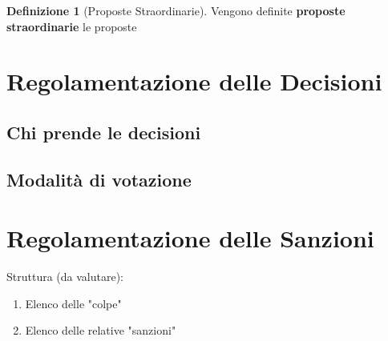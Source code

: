 \documentclass[]{article}
\theoremstyle{definition}
\newtheorem{defn}{Definizione}[section]
\begin{document}
\begin{defn}[Proposte Straordinarie]
	Vengono definite \textbf{proposte straordinarie} le proposte
\end{defn}


\section{Regolamentazione delle Decisioni}

\subsection{Chi prende le decisioni}

\subsection{Modalità di votazione}

\section{Regolamentazione delle Sanzioni}

Struttura (da valutare):
\begin{enumerate}
	\item Elenco delle "colpe"
	\item Elenco delle relative "sanzioni"
\end{enumerate}
\end{document}

